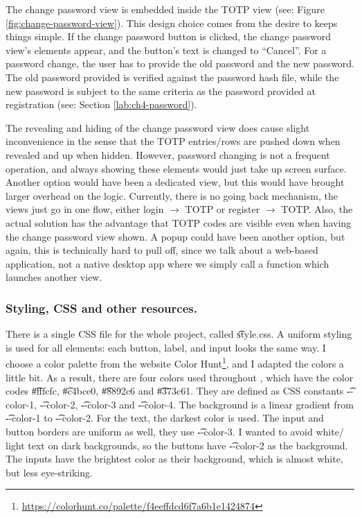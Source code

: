 The change password view is embedded inside the TOTP view (see: Figure \ref{fig:change-password-view}).
This design choice comes from the desire to keeps things simple.
If the change password button is clicked, the change password view's elements appear, and the button's text is changed to ``Cancel''.
For a password change, the user has to provide the old password and the new password.
The old password provided is verified against the password hash file, while the new password is subject to the same criteria as the password provided at registration (see: Section \ref{lab:ch4-password}).

The revealing and hiding of the change password view does cause slight inconvenience in the sense that the TOTP entries/rows are pushed down when revealed and up when hidden.
However, password changing is not a frequent operation, and always showing these elements would just take up screen surface.
Another option would have been a dedicated view, but this would have brought larger overhead on the logic.
Currently, there is no going back mechanism, the views just go in one flow, either login $\rightarrow$ TOTP or register $\rightarrow$ TOTP.
Also, the actual solution has the advantage that TOTP codes are visible even when having the change password view shown.
A popup could have been another option, but again, this is technically hard to pull off, since we talk about a web-based application, not a native desktop app where we simply call a function which launches another view.




\subsubsection{Styling, CSS and other resources.}

There is a single CSS file for the whole project, called \t{style.css}.
A uniform styling is used for all elements: each button, label, and input looks the same way.
I choose a color palette from the website Color Hunt\footnote{\url{https://colorhunt.co/palette/f4eeffdcd6f7a6b1e1424874}}, and I adapted the colors a little bit.
As a result, there are four colors used throughout \app{}, which have the color codes \t{\#fffcfc}, \t{\#c4bce0}, \t{\#8892c6} and \t{\#373c61}.
They are defined as CSS constants \t{-{}-color-1}, \t{-{}-color-2}, \t{-{}-color-3} and \t{-{}-color-4}.
The background is a linear gradient from \t{-{}-color-1} to \t{-{}-color-2}.
For the text, the darkest color is used.
The input and button borders are uniform as well, they use \t{-{}-color-3}.
I wanted to avoid white/ light text on dark backgrounds, so the buttons have \t{-{}-color-2} as the background.
The inputs have the brightest color as their background, which is almost white, but less eye-striking.

